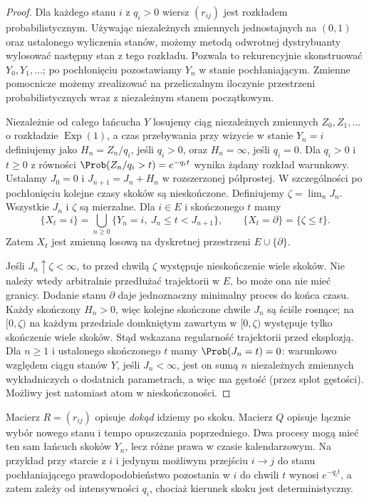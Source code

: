 \begin{proof}
Dla każdego stanu $i$ z $q_i>0$ wiersz $(r_{ij})$ jest
rozkładem probabilistycznym. Używając niezależnych zmiennych
jednostajnych na $(0,1)$ oraz ustalonego wyliczenia stanów,
możemy metodą odwrotnej dystrybuanty wylosować następny stan
z tego rozkładu. Pozwala to rekurencyjnie skonstruować
$Y_0,Y_1,\ldots$; po pochłonięciu pozostawiamy
$Y_n$ w stanie pochłaniającym. Zmienne pomocnicze
możemy zrealizować na przeliczalnym iloczynie przestrzeni
probabilistycznych wraz z niezależnym stanem początkowym.

Niezależnie od całego łańcucha $Y$ losujemy ciąg
niezależnych zmiennych $Z_0,Z_1,\ldots$ o rozkładzie
$\operatorname{Exp}(1)$, a czas przebywania przy wizycie
w stanie $Y_n=i$ definiujemy jako $H_n=Z_n/q_i$,
jeśli $q_i>0$, oraz $H_n=\infty$, jeśli $q_i=0$.
Dla $q_i>0$ i $t\ge0$ z równości
$\Prob(Z_n/q_i>t)=e^{-q_i t}$ wynika żądany rozkład
warunkowy. Ustalamy $J_0=0$ i $J_{n+1}=J_n+H_n$ w rozszerzonej
półprostej. W szczególności po pochłonięciu kolejne
czasy skoków są nieskończone. Definiujemy
$\zeta=\lim_n J_n$. Wszystkie $J_n$ i $\zeta$ są mierzalne.
Dla $i\in E$ i skończonego $t$ mamy
\[
\{X_t=i\}=\bigcup_{n\ge0}
\{Y_n=i,\ J_n\le t<J_{n+1}\},
\qquad \{X_t=\partial\}=\{\zeta\le t\}.
\]
Zatem $X_t$ jest zmienną losową na dyskretnej
przestrzeni $E\cup\{\partial\}$.

Jeśli $J_n\uparrow\zeta<\infty$, to przed chwilą $\zeta$
występuje nieskończenie wiele skoków. Nie należy wtedy
arbitralnie przedłużać trajektorii w $E$, bo może ona nie
mieć granicy. Dodanie stanu $\partial$ daje jednoznaczny
minimalny proces do końca czasu. Każdy skończony $H_n>0$, więc
kolejne skończone chwile $J_n$ są ściśle rosnące; na $[0,\zeta)$
na każdym przedziale domkniętym zawartym w $[0,\zeta)$
występuje tylko skończenie wiele skoków. Stąd wskazana
regularność trajektorii przed eksplozją.
Dla $n\ge1$ i ustalonego skończonego $t$ mamy
$\Prob(J_n=t)=0$: warunkowo względem ciągu stanów
$Y$, jeśli $J_n<\infty$, jest on sumą $n$ niezależnych
zmiennych wykładniczych o dodatnich parametrach, a więc
ma gęstość (przez splot gęstości). Możliwy jest natomiast
atom w nieskończoności.
\end{proof}

\begin{uwaga}
Macierz $R=(r_{ij})$ opisuje \emph{dokąd} idziemy po skoku.
Macierz $Q$ opisuje łącznie wybór nowego stanu i tempo
opuszczania poprzedniego. Dwa procesy mogą mieć ten sam łańcuch skoków $Y_n$,
lecz różne prawa w czasie kalendarzowym. Na przykład
przy starcie z $i$ i jedynym możliwym przejściu
$i\to j$ do stanu pochłaniającego prawdopodobieństwo
pozostania w $i$ do chwili $t$ wynosi $e^{-q_i t}$,
a zatem zależy od intensywności $q_i$, chociaż kierunek
skoku jest deterministyczny.
\end{uwaga}


